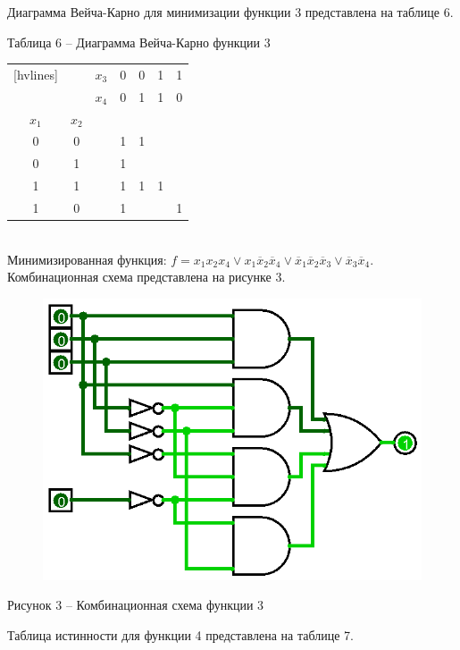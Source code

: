 \documentclass[a4paper,14pt]{extarticle}
\begin{document}
  Диаграмма Вейча-Карно для минимизации функции 3 представлена на таблице 6.
  
  \noindent Таблица 6 -- Диаграмма Вейча-Карно функции 3 \\
  \begin{NiceTabular}{ccccccc}[hvlines]
    & & $x_3$ & 0 & 0 & 1 & 1 \\
    & & $x_4$ & 0 & 1 & 1 & 0 \\
    $x_1$ & $x_2$ & & & & & \\
    0 & 0 & & 1 & 1 & & \\
    0 & 1 & & 1 & & & \\
    1 & 1 & & 1 & 1 & 1 & \\
    1 & 0 & & 1 & & & 1 \\
  \end{NiceTabular} \\
  
  Минимизированная функция: $f=x_1x_2x_4\lor x_1\overline{x}_2\overline{x}_4\lor \overline{x}_1\overline{x}_2\overline{x}_3\lor \overline{x}_3\overline{x}_4$. Комбинационная схема представлена на рисунке 3.
  
  \pagebreak
  \begin{figure}[h]
    \centering
    \includegraphics[width=0.5\linewidth]{images/s-1-3}
  \end{figure}
  \begin{center}
    Рисунок 3 – Комбинационная схема функции 3
  \end{center}
  
  Таблица истинности для функции 4 представлена на таблице 7.
  
\end{document}
